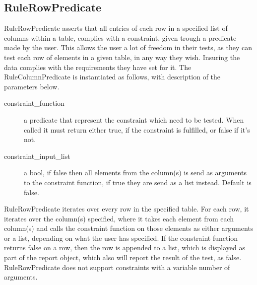 \subsection{RuleRowPredicate}\label{RCP}

RuleRowPredicate asserts that all entries of each row in a specified list of columns within a table, complies with a constraint, given trough a predicate made by the user. This allows the user a lot of freedom in their tests, as they can test each row of elements in a given table, in any way they wish. Insuring the data complies with the requirements they have set for it. The RuleColumnPredicate is instantiated as follows, with description of the parameters below.


\begin{description}
\item [constraint\_function] a predicate that represent the constraint which need to be tested. When called it must return either true, if the constraint is fulfilled, or false if it's not.
\item [constraint\_input\_list] a bool, if false then all elements from the column(s) is send as arguments to the constraint function, if true they are send as a list instead. Default is false.
\end{description}

RuleRowPredicate iterates over every row in the specified table. For each row, it iterates over the column(s) specified, where it takes each element from each column(s) and calls the constraint function on those elements as either arguments or a list, depending on what the user has specified. If the constraint function returns false on a row, then the row is appended to a list, which is displayed as part of the report object, which also will report the result of the test, as false. RuleRowPredicate does not support constraints with a variable number of arguments.